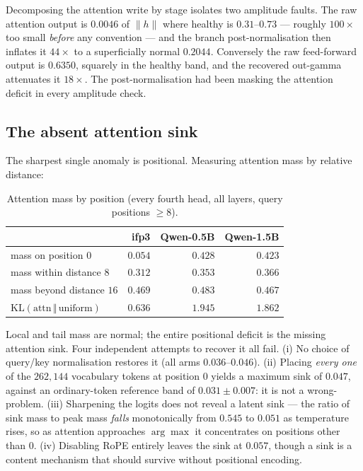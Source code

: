 Decomposing the attention write by stage isolates two amplitude faults. The raw attention output
is $0.0046$ of $\lVert h\rVert$ where healthy is $0.31$--$0.73$ --- roughly $100\times$ too small
\emph{before} any convention --- and the branch post-normalisation then inflates it $44\times$ to a
superficially normal $0.2044$. Conversely the raw feed-forward output is $0.6350$, squarely in the
healthy band, and the recovered out-gamma attenuates it $18\times$. The post-normalisation had been
masking the attention deficit in every amplitude check.

\subsection{The absent attention sink}

The sharpest single anomaly is positional. Measuring attention mass by relative distance:

\begin{table}[h]
\centering\small
\caption{Attention mass by position (every fourth head, all layers, query positions $\geq 8$).}
\begin{tabular}{lrrr}
\toprule
 & ifp3 & Qwen-0.5B & Qwen-1.5B \\
\midrule
mass on position $0$ & $0.054$ & $0.428$ & $0.423$ \\
mass within distance $8$ & $0.312$ & $0.353$ & $0.366$ \\
mass beyond distance $16$ & $0.469$ & $0.483$ & $0.467$ \\
$\mathrm{KL}(\text{attn}\,\Vert\,\text{uniform})$ & $0.636$ & $1.945$ & $1.862$ \\
\bottomrule
\end{tabular}
\end{table}

Local and tail mass are normal; the entire positional deficit is the missing attention sink.
Four independent attempts to recover it all fail. (i) No choice of query/key normalisation
restores it (all arms $0.036$--$0.046$). (ii) Placing \emph{every one} of the $262{,}144$
vocabulary tokens at position $0$ yields a maximum sink of $0.047$, against an ordinary-token
reference band of $0.031\pm0.007$: it is not a wrong- problem. (iii) Sharpening the
logits does not reveal a latent sink --- the ratio of sink mass to peak mass \emph{falls}
monotonically from $0.545$ to $0.051$ as temperature rises, so as attention approaches
$\arg\max$ it concentrates on positions other than $0$. (iv) Disabling RoPE entirely leaves the
sink at $0.057$, though a sink is a content mechanism that should survive without positional
encoding.

